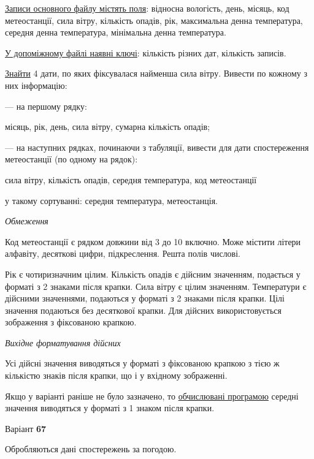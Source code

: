 \documentclass[11pt, ukrainian]{article}
\begin{document}
\underline{Записи основного файлу містять поля}: відносна вологість, день, місяць, код метеостанції, сила вітру, кількість опадів, рік, максимальна денна температура, середня денна температура, мінімальна денна температура.

\underline{У допоміжному файлі наявні ключі}: кількість різних дат, кількість записів.

\underline{Знайти} 4 дати, по яких фіксувалася найменша сила вітру. Вивести по кожному з них інформацію:\par
{\noindent}--- на першому рядку:\par
місяць, рік, день, сила вітру, сумарна кількість опадів;

{\noindent}--- на наступних рядках, починаючи з табуляції, вивести для дати спостереження метеостанції (по одному на рядок):\par
сила вітру, кількість опадів, середня температура, код метеостанції

{\noindent}у такому сортуванні: середня температура, метеостанція.


\bigskip\textit{Обмеження}

Код метеостанції є рядком довжини від 3 до 10 включно.
Може містити літери алфавіту, десяткові цифри, підкреслення. Решта полів числові.

Рік є чотиризначним цілим.
Кількість опадів є дійсним значенням, подається у форматі з 2 знаками після крапки.
Сила вітру є цілим значенням.
Температури є дійсними значеннями, подаються у форматі з 2 знаками після крапки.
Цілі значення подаються без десяткової крапки.
Для дійсних використовується зображення з фіксованою крапкою.

\textit{Вихідне форматування дійсних}

Усі дійсні значення виводяться у форматі з фіксованою крапкою з тією ж кількістю знаків після крапки, що і у вхідному зображенні.

Якщо у варіанті раніше не було зазначено, то \underline{обчислювані програмою} середні значення виводяться у форматі з 1 знаком після крапки.




\par
\newpage
{\center Варіант  \No \textbf { 67 }\par}
\bigskip
Обробляються дані спостережень за погодою. 
\end{document}
